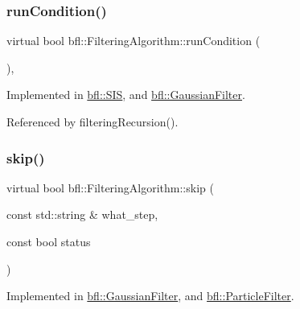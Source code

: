 \subsubsection{\texorpdfstring{run\+Condition()}{runCondition()}}
{\footnotesize\ttfamily virtual bool bfl\+::\+Filtering\+Algorithm\+::run\+Condition (\begin{DoxyParamCaption}{ }\end{DoxyParamCaption})\hspace{0.3cm}{\ttfamily [protected]}, {}}



Implemented in \mbox{\hyperlink{classbfl_1_1SIS_a669ac8eb19f6797f2735b94074727e8f}{bfl\+::\+S\+IS}}, and \mbox{\hyperlink{classbfl_1_1GaussianFilter_acf6902f6156c573560b57f10c1992b8a}{bfl\+::\+Gaussian\+Filter}}.



Referenced by filtering\+Recursion().

\mbox{\label{classbfl_1_1FilteringAlgorithm_ac8a718a614905d89d6a43bbbc70d68b2}} 
\subsubsection{\texorpdfstring{skip()}{skip()}}
{\footnotesize\ttfamily virtual bool bfl\+::\+Filtering\+Algorithm\+::skip (\begin{DoxyParamCaption}\item[{const std\+::string \&}]{what\+\_\+step,  }\item[{const bool}]{status }\end{DoxyParamCaption})\hspace{0.3cm}{\ttfamily [pure virtual]}}



Implemented in \mbox{\hyperlink{classbfl_1_1GaussianFilter_a3ca79ee1451863d898baeea6a74ababd}{bfl\+::\+Gaussian\+Filter}}, and \mbox{\hyperlink{classbfl_1_1ParticleFilter_a2d7a5e7aaad179037273d35be229056d}{bfl\+::\+Particle\+Filter}}.

\mbox{\label{classbfl_1_1FilteringAlgorithm_a1dc912d89ee8f96d4f3e8209865c5308}} 
